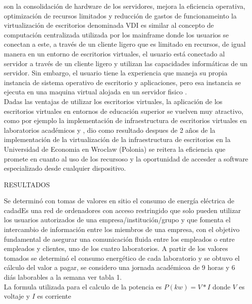 \documentclass[a4paper,11pt]{article}
\begin{document}
son la consolidaci\'on de hardware de los servidores, mejora la eficiencia operativa,
optimizaci\'on de recursos limitados y reducci\'on de gastos de funcionameinto la virtualizaci\'on 
de escritorios denominada VDI es similar al concepto de computaci\'on centralizada utilizada
por los mainframe donde los usuarios se conectan a este, a trav\'es de un cliente ligero que es 
limitado en recursos, de igual manera en un entorno de escritorios virtuales, el usuario est\'a conectado
al servidor a trav\'es de un cliente ligero y utilizan las capacidades inform\'aticas de un servidor. Sin
embargo, el usuario tiene la experiencia que maneja su propia instancia de sistema operativo de
escritorio y aplicaciones, pero esa instancia se ejecuta en una maquina virtual alojada en un servidor
fisico \cite{Agrawal2014}.\\
Dadas las ventajas de utilizar los escritorios virtuales, la aplicaci\'on de los escritorios virtuales en
entornos de educaci\'on superior se vuelven muy atractivo, como por ejemplo la implementaci\'on de infraestructura
de escritorios virtuales en laboratorios acad\'emicos \cite{Chroback2014} y \cite{Enrique2016},  dio como resultado despues de 2 años de
la implementaci\'on de la virtualizaci\'on de la infraestructura de escritorios en la Universidad de Economia
en Wroclaw (Polonia) se reitera la eficiencia que promete en cuanto al uso de los recursoso y la oportunidad
de accesder a software especializado desde cualquier dispositivo.\\
\begin{bf}
RESULTADOS\\ 
\end{bf}
Se determin\'o con tomas de valores en sitio el consumo de energ\'ia el\'ectrica de cadadEs una red de ordenadores con acceso restringido que solo pueden utilizar los 
usuarios autorizados de una empresa/institución/grupo y que fomenta el intercambio
de información entre los miembros de una empresa, con el objetivo fundamental de 
asegurar una comunicación fluida entre los empleados o entre empleados y clientes, 
uno de los cuatro laboratorios. A partir de los valores tomados se determin\'o 
el consumo energ\'etico de cada laboratorio y se obtuvo el c\'alculo del valor
a pagar, se considero una jornada acad\'emicoa de 9 horas y 6 di\'as laborables a la 
semana ver tabla 1.\\
La formula utilizada para el calculo de la potencia es $P(kw)=V*I$ donde $V$ es voltaje y $I$ es corriente
\end{document}
